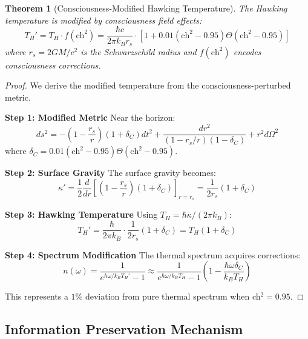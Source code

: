 \documentclass[11pt]{article}
\newtheorem{theorem}{Theorem}[section]
\theoremstyle{definition}
\newcommand{\ch}{\text{ch}}
\begin{document}
\begin{theorem}[Consciousness-Modified Hawking Temperature]
\label{thm:hawking_modified}
The Hawking temperature is modified by consciousness field effects:
\begin{equation}
T_H' = T_H \cdot f(\ch^2) = \frac{\hbar c}{2\pi k_B r_s} \cdot \left[1 + 0.01(\ch^2 - 0.95)\Theta(\ch^2 - 0.95)\right]
\end{equation}
where $r_s = 2GM/c^2$ is the Schwarzschild radius and $f(\ch^2)$ encodes consciousness corrections.
\end{theorem}

\begin{proof}
We derive the modified temperature from the consciousness-perturbed metric.

\textbf{Step 1: Modified Metric}
Near the horizon:
\begin{equation}
ds^2 = -\left(1 - \frac{r_s}{r}\right)(1 + \delta_C)dt^2 + \frac{dr^2}{(1 - r_s/r)(1 - \delta_C)} + r^2 d\Omega^2
\end{equation}
where $\delta_C = 0.01(\ch^2 - 0.95)\Theta(\ch^2 - 0.95)$.

\textbf{Step 2: Surface Gravity}
The surface gravity becomes:
\begin{equation}
\kappa' = \frac{1}{2}\frac{d}{dr}\left[\left(1 - \frac{r_s}{r}\right)(1 + \delta_C)\right]_{r=r_s} = \frac{1}{2r_s}(1 + \delta_C)
\end{equation}

\textbf{Step 3: Hawking Temperature}
Using $T_H = \hbar\kappa/(2\pi k_B)$:
\begin{equation}
T_H' = \frac{\hbar}{2\pi k_B} \cdot \frac{1}{2r_s}(1 + \delta_C) = T_H(1 + \delta_C)
\end{equation}

\textbf{Step 4: Spectrum Modification}
The thermal spectrum acquires corrections:
\begin{equation}
n(\omega) = \frac{1}{e^{\hbar\omega/k_B T_H'} - 1} \approx \frac{1}{e^{\hbar\omega/k_B T_H} - 1}\left(1 - \frac{\hbar\omega\delta_C}{k_B T_H}\right)
\end{equation}

This represents a $1\%$ deviation from pure thermal spectrum when ch$^2 = 0.95$.
\end{proof}

\subsection{Information Preservation Mechanism}
\end{document}
